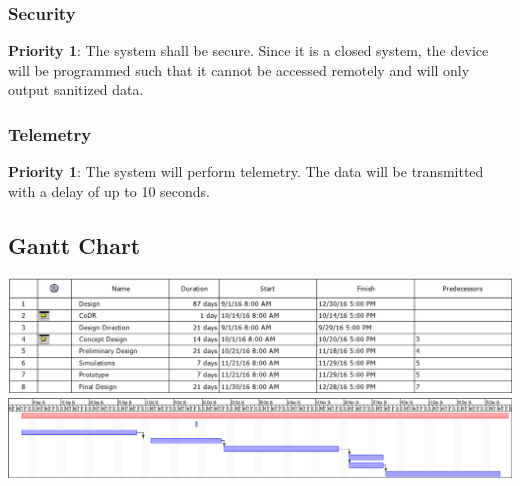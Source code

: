 \subsubsection{Security}
\textbf{Priority 1}: The system shall be secure. Since it is a closed system, the device will be programmed such that it cannot be accessed remotely and will only output sanitized data.
\subsubsection{Telemetry}
\textbf{Priority 1}: The system will perform telemetry. The data will be transmitted with a delay of up to 10 seconds.

\subsection{Gantt Chart}
\includegraphics[width=\textwidth]{./images/gantttable}
\includegraphics[width=\textwidth]{./images/ganttchart}

